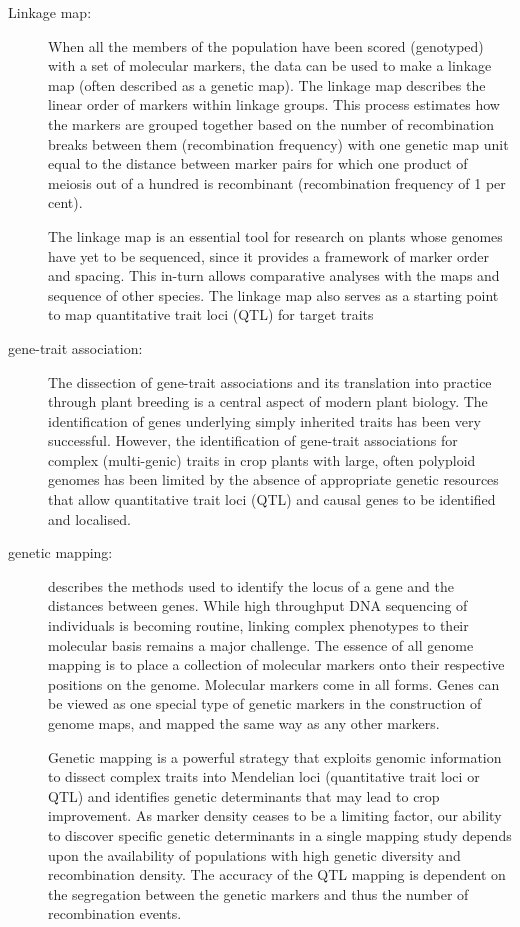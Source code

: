 \documentclass[a4paper,10pt]{article}
\begin{document}
\begin{description}
\item[Linkage map:] When all the members of the population have been scored (genotyped) with a set of molecular markers, the data can be used to make a linkage map (often described as a genetic map). The linkage map describes the linear order of markers within linkage groups.
This process estimates how the markers are grouped together based on the number of recombination breaks between them (recombination frequency) with one genetic map unit equal to the distance between marker pairs for which one product of meiosis out of a hundred is recombinant (recombination frequency of 1 per cent).

The linkage map is an essential tool for research on plants whose genomes have yet to be sequenced, since it provides a framework of marker order and spacing. 
This in-turn allows comparative analyses with the maps and sequence of other species. 
The linkage map also serves as a starting point to map quantitative trait loci (QTL) for target traits


\item[gene-trait association:] The dissection of gene-trait associations and its translation into practice through plant breeding is a central aspect of modern plant biology. 
The identification of genes underlying simply inherited traits has been very successful. 
However, the identification of gene-trait associations for complex (multi-genic) traits in crop plants with large, often polyploid genomes has been limited by the absence of appropriate genetic resources that allow quantitative trait loci (QTL) and causal genes to be identified and localised.


\item [genetic mapping:] describes the methods used to identify the locus of a gene and the distances between genes.
While high throughput DNA sequencing of individuals is becoming routine, linking complex phenotypes to their molecular basis remains a major challenge. 
The essence of all genome mapping is to place a collection of molecular markers onto their respective positions on the genome. 
Molecular markers come in all forms. Genes can be viewed as one special type of genetic markers in the construction of genome maps, and mapped the same way as any other markers.

Genetic mapping is a powerful strategy that exploits genomic information to dissect complex traits into Mendelian loci (quantitative trait loci or QTL) and identifies genetic determinants that may lead to crop improvement. 
As marker density ceases to be a limiting factor, our ability to discover specific genetic determinants in a single mapping study depends upon the availability of populations with high genetic diversity and recombination density.
The accuracy of the QTL mapping is dependent on the segregation between the genetic markers and thus the number of recombination events. 



\end{description}
\end{document}

